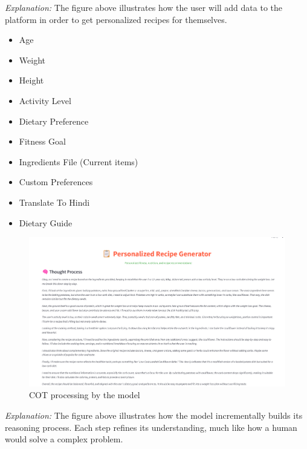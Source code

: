 \documentclass[letterpaper,11pt]{report}
\begin{document}
\noindent
\textit{Explanation:} The figure above illustrates how the user will add data to the platform in order to get personalized recipes for themselves.
\begin{itemize}
    \item Age
    \item Weight
    \item Height
    \item Activity Level
    \item Dietary Preference 
    \item Fitness Goal
    \item Ingredients File (Current items)
    \item Custom Preferences
    \item Translate To Hindi
    \item Dietary Guide 
\end{itemize}

\begin{figure}[h]
    \centering
    \includegraphics[width=\linewidth]{Thought_process.png}
    \caption{COT processing by the model}
    \label{fig:Thought Process}
\end{figure}
\noindent
\textit{Explanation:} The figure above illustrates how the model incrementally builds its reasoning process. Each step refines its understanding, much like how a human would solve a complex problem.
\end{document}
